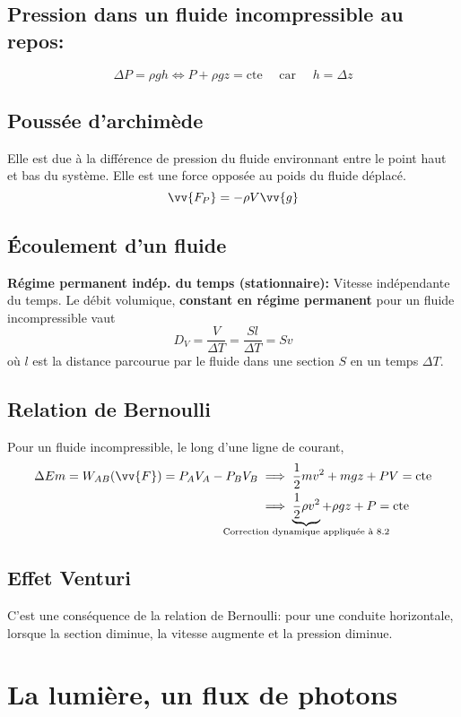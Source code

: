 \documentclass[a5paper,10pt]{article}
\renewcommand*{\vec}{\vv}
\begin{document}
    \subsection{Pression dans un fluide incompressible au repos: }
    \[
      \Delta P=\rho g h \iff P+\rho g z = \mathrm{cte} \quad\text{ car }\quad h=\Delta z
    \]
    
  \subsection{Poussée d'archimède}
  Elle est due à la différence de pression du fluide environnant entre le point haut et bas du système. Elle est une force opposée au poids du fluide déplacé.
  \[
    \vec{F_P}=-\rho V \vec{g}
  \]
  \subsection{Écoulement d'un fluide}
  \textbf{Régime permanent indép. du temps (stationnaire):} Vitesse indépendante du temps.
  Le débit volumique, \textbf{constant en régime permanent} pour un fluide incompressible vaut
  \[
    D_V=\frac{V}{\Delta T}=\frac{Sl}{\Delta T}=Sv
  \]
  où $l$ est la distance parcourue par le fluide dans une section $S$ en un temps $\Delta T$.

\vspace{4pt}
  \subsection{Relation de Bernoulli}
  Pour un fluide incompressible, le long d'une ligne de courant,
  \[
    \begin{aligned}
      \Delta Em=W_{AB}(\vec{F})=P_AV_A-P_BV_B &\implies \frac{1}{2}mv^2+mgz+PV=\mathrm{cte}\\
      & \implies \underbrace{\frac{1}{2}\rho v^2}_{\mathclap{\text{Correction dynamique appliquée à 8.2}}}+\rho g z + P = \mathrm{cte}
    \end{aligned}
  \]
  \subsection{Effet Venturi}
  C'est une conséquence de la relation de Bernoulli: pour une conduite horizontale, lorsque la section diminue, la vitesse augmente et la pression diminue.\\
  
\section{La lumière, un flux de photons}
\end{document}

